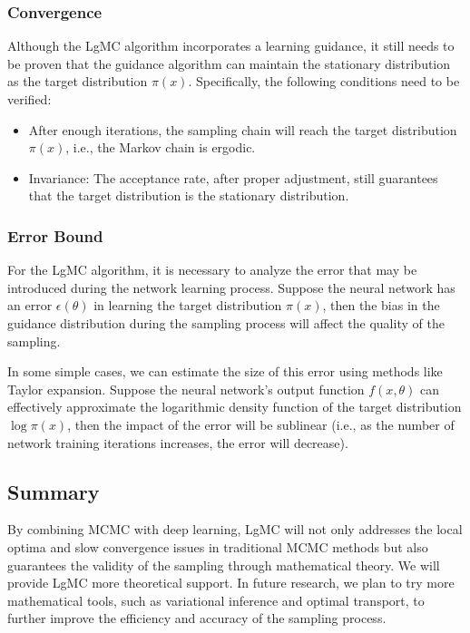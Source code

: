 \documentclass[twocolumn]{article}
\begin{document}

\subsubsection{Convergence}
Although the LgMC algorithm incorporates a learning guidance, it still needs to be proven that the guidance algorithm can maintain the stationary distribution as the target distribution $\pi(x)$. Specifically, the following conditions need to be verified:
\begin{itemize}
    \item After enough iterations, the sampling chain will reach the target distribution $\pi(x)$, i.e., the Markov chain is ergodic.
    \item Invariance: The acceptance rate, after proper adjustment, still guarantees that the target distribution is the stationary distribution.
\end{itemize}

\subsubsection{Error Bound}
For the LgMC algorithm, it is necessary to analyze the error that may be introduced during the network learning process. Suppose the neural network has an error $\epsilon(\theta)$ in learning the target distribution $\pi(x)$, then the bias in the guidance distribution during the sampling process will affect the quality of the sampling.

In some simple cases, we can estimate the size of this error using methods like Taylor expansion. Suppose the neural network's output function $f(x, \theta)$ can effectively approximate the logarithmic density function of the target distribution $\log \pi(x)$, then the impact of the error will be sublinear (i.e., as the number of network training iterations increases, the error will decrease).

\subsection{Summary}
By combining MCMC with deep learning, LgMC will not only addresses the local optima and slow convergence issues in traditional MCMC methods but also guarantees the validity of the sampling through mathematical theory.  We will provide LgMC more theoretical support. In future research, we plan to try more mathematical tools, such as variational inference and optimal transport, to further improve the efficiency and accuracy of the sampling process.
\end{document}
